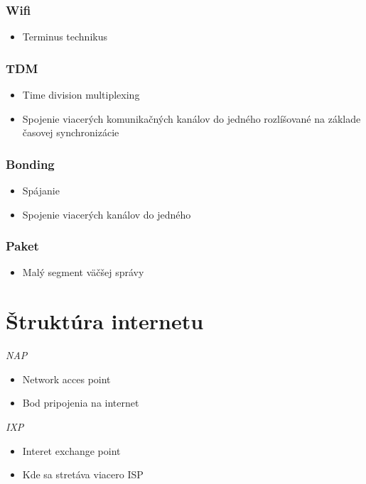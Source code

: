 \documentclass[10pt,xcolor=pdflatex,hyperref={unicode}]{beamer}
\begin{document}
    \begin{frame}
        \frametitle{Wifi}
        \begin{itemize}
            \item Terminus technikus
        \end{itemize}
    \end{frame}

    \begin{frame}
        \frametitle{TDM}
        \begin{itemize}
            \item Time division multiplexing
            \item Spojenie viacerých komunikačných kanálov do jedného rozlíšované na základe časovej synchronizácie
        \end{itemize}
    \end{frame}

    \begin{frame}
        \frametitle{Bonding}
        \begin{itemize}
            \item Spájanie
            \item Spojenie viacerých kanálov do jedného
        \end{itemize}
    \end{frame}

    \begin{frame}
        \frametitle{Paket}
        \begin{itemize}
            \item Malý segment väčšej správy
        \end{itemize}
    \end{frame}


    \section{Štruktúra internetu}
    \begin{frame}
        \emph{NAP}
        \begin{itemize}
            \item Network acces point
            \item Bod pripojenia na internet
        \end{itemize}
        \emph{IXP}
        \begin{itemize}
            \item Interet exchange point
            \item Kde sa stretáva viacero ISP
        \end{itemize}
    \end{frame}
\end{document}
